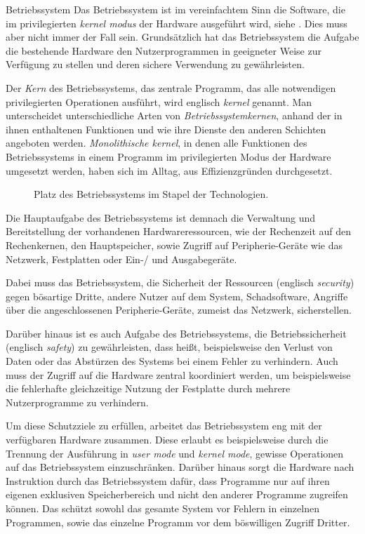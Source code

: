 \documentclass[12pt, a4paper]{article}
\begin{document}
\begin{defbox}{Betriebssystem}
Das Betriebssystem ist im vereinfachtem Sinn die Software, die im privilegierten \textit{kernel modus} der Hardware ausgeführt wird, siehe .
Dies muss aber nicht immer der Fall sein.
Grundsätzlich hat das Betriebssystem die Aufgabe die bestehende Hardware den Nutzerprogrammen in geeigneter Weise zur Verfügung zu stellen und deren sichere Verwendung zu gewährleisten.
\end{defbox}

Der \emph{Kern} des Betriebssystems, das zentrale Programm, das alle notwendigen privilegierten Operationen ausführt, wird englisch \emph{kernel} genannt.
Man unterscheidet unterschiedliche Arten von \emph{Betriebssystemkernen}, anhand der in ihnen enthaltenen Funktionen und wie ihre Dienste den anderen Schichten angeboten werden.
\emph{Monolithische kernel}, in denen alle Funktionen des Betriebssystems in einem Programm im privilegierten Modus der Hardware umgesetzt werden, haben sich im Alltag, aus Effizienzgründen durchgesetzt.

\begin{wrapfigure}{r}{8.7cm}

\caption{Platz des Betriebssystems im Stapel der Technologien.}
\label{fig:stack}
\end{wrapfigure}

Die Hauptaufgabe des Betriebssystems ist demnach die Verwaltung und Bereitstellung der vorhandenen Hardwareressourcen, wie der Rechenzeit auf den Rechenkernen, den Hauptspeicher, sowie Zugriff auf Peripherie-Geräte wie das Netzwerk, Festplatten oder Ein-/ und Ausgabegeräte.

\label{sec:security_safety}
Dabei muss das Betriebssystem, die Sicherheit der Ressourcen (englisch \emph{security}) gegen bösartige Dritte, andere Nutzer auf dem System, Schadsoftware, Angriffe über die angeschlossenen Peripherie-Geräte, zumeist das Netzwerk, sicherstellen.

Darüber hinaus ist es auch Aufgabe des Betriebssystems, die Betriebssicherheit (englisch \emph{safety}) zu gewährleisten, dass heißt, beispielsweise den Verlust von Daten oder das Abstürzen des Systems bei einem Fehler zu verhindern.
Auch muss der Zugriff auf die Hardware zentral koordiniert werden, um beispielsweise die fehlerhafte gleichzeitige Nutzung der Festplatte durch mehrere Nutzerprogramme zu verhindern.

Um diese Schutzziele zu erfüllen, arbeitet das Betriebssystem eng mit der verfügbaren Hardware zusammen.
Diese erlaubt es beispielsweise durch die Trennung der Ausführung in \textit{user mode} und \textit{kernel mode}, gewisse Operationen auf das Betriebssystem einzuschränken.
Darüber hinaus sorgt die Hardware nach Instruktion durch das Betriebssystem dafür, dass Programme nur auf ihren eigenen exklusiven Speicherbereich und nicht den anderer Programme zugreifen können.
Das schützt sowohl das gesamte System vor Fehlern in einzelnen Programmen, sowie das einzelne Programm vor dem böswilligen Zugriff Dritter.
\end{document}
